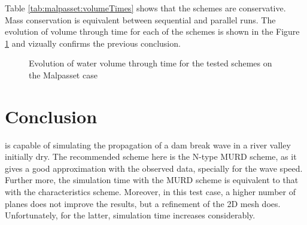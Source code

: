Table \ref{tab:malpasset:volumeTimes} shows that the schemes are conservative. Mass conservation is equivalent between sequential and parallel runs. The evolution of volume through time for each of the schemes is shown in the Figure \ref{fig:malpasset:VoLTime} and vizually confirms the previous conclusion.

\begin{figure}[H]
\centering
  \caption{Evolution of water volume through time for the tested schemes on the Malpasset case}
\label{fig:malpasset:VoLTime}
\end{figure}

\section{Conclusion}

 is capable of simulating the propagation of a dam break wave in a river valley initially dry. The recommended scheme here is the N-type MURD scheme, as it gives a good approximation with the observed data, specially for the wave speed. Further more, the simulation time with the MURD scheme is equivalent to that with the characteristics scheme.
Moreover, in this test case, a higher number of planes does not improve the results, but a refinement of the 2D mesh does.
Unfortunately, for the latter, simulation time increases considerably.
